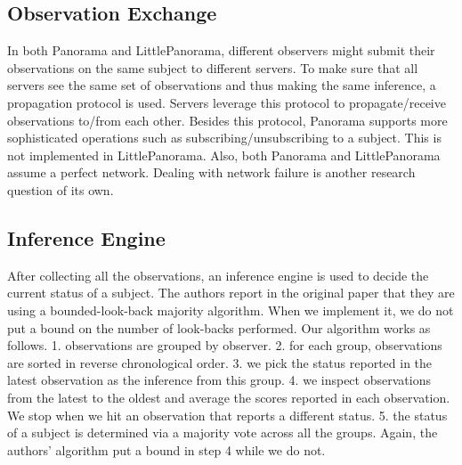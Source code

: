 \subsection{Observation Exchange}
In both Panorama and LittlePanorama, different observers might submit their observations on the same subject to different servers. To make sure that all servers see the same set of observations and thus making the same inference, a propagation protocol is used. Servers leverage this protocol to propagate/receive observations to/from each other. Besides this protocol, Panorama supports more sophisticated operations such as subscribing/unsubscribing to a subject. This is not implemented in LittlePanorama. Also, both Panorama and LittlePanorama assume a perfect network. Dealing with network failure is another research question of its own.

\subsection{Inference Engine}
\label{subsec:ie}
After collecting all the observations, an inference engine is used to decide the current status of a subject. The authors report in the original paper that they are using a bounded-look-back majority algorithm. When we implement it, we do not put a bound on the number of look-backs performed. Our algorithm works as follows. 1. observations are grouped by observer. 2. for each group, observations are sorted in reverse chronological order. 3. we pick the status reported in the latest observation as the inference from this group. 4. we inspect observations from the latest to the oldest and average the scores reported in each observation. We stop when we hit an observation that reports a different status. 5. the status of a subject is determined via a majority vote across all the groups. Again, the authors' algorithm put a bound in step 4 while we do not.